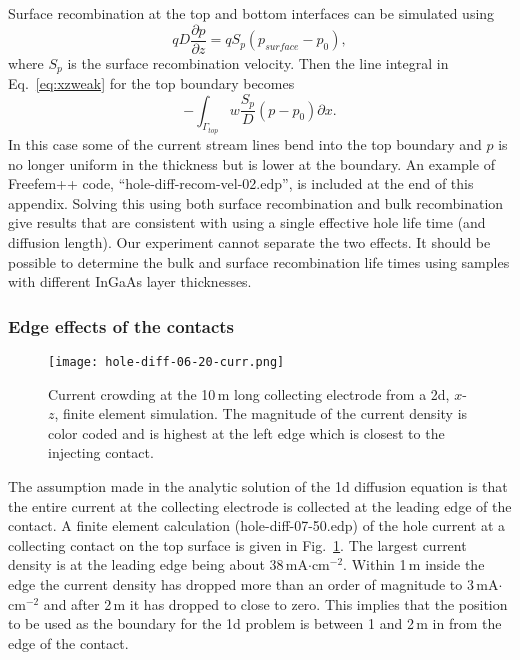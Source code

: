 Surface recombination at the top and bottom interfaces can be simulated
using \cite{sze2}
\begin{equation}
qD\frac{\partial p}{\partial z} = qS_p(p_{surface}-p_0),
\end{equation}
where $S_p$ is the surface recombination velocity.
Then the line integral in Eq.~\ref{eq:xzweak} for the top boundary
becomes
\begin{equation}
-\int_{\Gamma_{top}} w\frac{S_p}{D}(p-p_0)\partial x.
\end{equation}
In this case some of the current stream lines bend into the top boundary
and $p$ is no longer uniform in the thickness but is lower at the boundary.
An example of Freefem++ code, ``hole-diff-recom-vel-02.edp'', is included
at the end of this appendix.
Solving this using both surface recombination and bulk recombination give results
that are consistent with using a single effective hole life time (and diffusion length).
Our experiment cannot separate the two effects.  It should be possible
to determine the bulk and surface recombination life times using samples
with different InGaAs layer thicknesses.

   \subsubsection{Edge effects of the contacts}

\begin{figure}
\centering
\texttt{[image: hole-diff-06-20-curr.png]}
\caption{Current crowding at the 10\,\textmu m long collecting electrode
  from a 2d, $x$-$z$, finite element simulation.
  The magnitude of the current density is color coded and is highest
 at the left edge which is closest to the injecting contact.
}%
\label{fig:hole-diff-06-20-curr}
\end{figure}

The assumption made in the analytic solution of the 1d diffusion equation
is that the entire current at the collecting electrode is collected at
the leading edge of the contact.  A finite element calculation
(hole-diff-07-50.edp) of the
hole current at a collecting contact on the top surface is given in 
Fig.~\ref{fig:hole-diff-06-20-curr}.
The largest current density is at the leading edge being about
$38$\,mA$\cdot$cm$^{-2}$.  Within 1\,\textmu m inside the edge
the current density has dropped more than an order of magnitude
 to $3$\,mA$\cdot$cm$^{-2}$
and after 2\,\textmu m it has dropped to close to zero.  This implies that
the position to be used as the boundary for the 1d problem is between 1
and 2\,\textmu m in from the edge of the contact.


